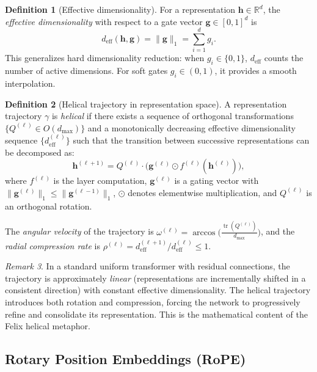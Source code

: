 \documentclass[11pt,a4paper]{article}
\theoremstyle{definition}
\newtheorem{definition}{Definition}[section]
\theoremstyle{plain}
\theoremstyle{remark}
\newtheorem{remark}[definition]{Remark}
\newcommand{\R}{\mathbb{R}}
\newcommand{\tr}{\operatorname{tr}}
\begin{document}
\begin{definition}[Effective dimensionality]\label{def:eff-dim}
For a representation $\mathbf{h} \in \R^d$, the \emph{effective 
dimensionality} with respect to a gate vector $\mathbf{g} \in [0,1]^d$ is
\[
  d_{\text{eff}}(\mathbf{h}, \mathbf{g}) = \|\mathbf{g}\|_1 = 
  \sum_{i=1}^{d} g_i.
\]
This generalizes hard dimensionality reduction: when $g_i \in \{0,1\}$, 
$d_{\text{eff}}$ counts the number of active dimensions. For soft gates 
$g_i \in (0,1)$, it provides a smooth interpolation.
\end{definition}

\begin{definition}[Helical trajectory in representation space]
\label{def:helical-traj}
A representation trajectory $\gamma$ is \emph{helical} if there exists a 
sequence of orthogonal transformations $\{Q^{(\ell)} \in O(d_{\max})\}$ 
and a monotonically decreasing effective dimensionality sequence 
$\{d_{\text{eff}}^{(\ell)}\}$ such that the transition between successive 
representations can be decomposed as:
\begin{equation}\label{eq:helical-decomp}
  \mathbf{h}^{(\ell+1)} = Q^{(\ell)} \cdot 
  \bigl(\mathbf{g}^{(\ell)} \odot f^{(\ell)}(\mathbf{h}^{(\ell)})\bigr),
\end{equation}
where $f^{(\ell)}$ is the layer computation, $\mathbf{g}^{(\ell)}$ is a 
gating vector with $\|\mathbf{g}^{(\ell)}\|_1 \leq 
\|\mathbf{g}^{(\ell-1)}\|_1$, $\odot$ denotes elementwise multiplication, 
and $Q^{(\ell)}$ is an orthogonal rotation.

The \emph{angular velocity} of the trajectory is 
$\omega^{(\ell)} = \arccos\bigl(\frac{\tr(Q^{(\ell)})}{d_{\max}}\bigr)$, 
and the \emph{radial compression rate} is 
$\rho^{(\ell)} = d_{\text{eff}}^{(\ell+1)} / d_{\text{eff}}^{(\ell)} 
\leq 1$.
\end{definition}

\begin{remark}
In a standard uniform transformer with residual connections, the trajectory 
is approximately \emph{linear} (representations are incrementally shifted 
in a consistent direction) with constant effective dimensionality. The 
helical trajectory introduces both rotation and compression, forcing the 
network to progressively refine and consolidate its representation. This is 
the mathematical content of the Felix helical metaphor.
\end{remark}

\subsection{Rotary Position Embeddings (RoPE)}\label{sec:rope}
\end{document}
